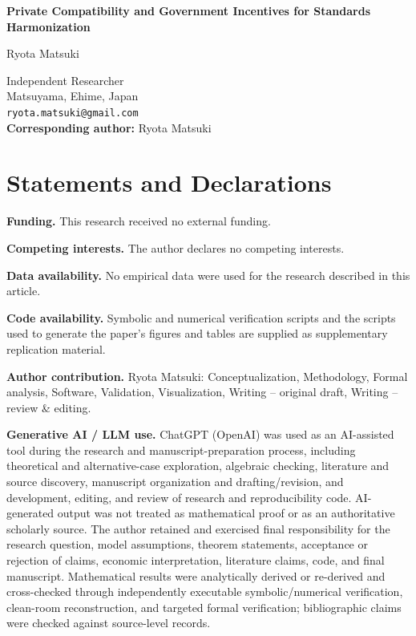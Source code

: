 \documentclass[11pt]{article}
\begin{document}
\begin{center}
{\Large\bfseries Private Compatibility and Government Incentives for Standards Harmonization\par}
\vspace{2em}
{\large Ryota Matsuki\par}
\vspace{1em}
Independent Researcher\\
Matsuyama, Ehime, Japan\\
\texttt{ryota.matsuki@gmail.com}\\
\vspace{1em}
\textbf{Corresponding author:} Ryota Matsuki
\end{center}

\section*{Statements and Declarations}
\textbf{Funding.} This research received no external funding.

\textbf{Competing interests.} The author declares no competing interests.

\textbf{Data availability.} No empirical data were used for the research described in this article.

\textbf{Code availability.} Symbolic and numerical verification scripts and the scripts used to generate the paper's figures and tables are supplied as supplementary replication material.

\textbf{Author contribution.} Ryota Matsuki: Conceptualization, Methodology, Formal analysis, Software, Validation, Visualization, Writing -- original draft, Writing -- review \& editing.

\textbf{Generative AI / LLM use.} ChatGPT (OpenAI) was used as an AI-assisted tool during the research and manuscript-preparation process, including theoretical and alternative-case exploration, algebraic checking, literature and source discovery, manuscript organization and drafting/revision, and development, editing, and review of research and reproducibility code. AI-generated output was not treated as mathematical proof or as an authoritative scholarly source. The author retained and exercised final responsibility for the research question, model assumptions, theorem statements, acceptance or rejection of claims, economic interpretation, literature claims, code, and final manuscript. Mathematical results were analytically derived or re-derived and cross-checked through independently executable symbolic/numerical verification, clean-room reconstruction, and targeted formal verification; bibliographic claims were checked against source-level records.
\end{document}
